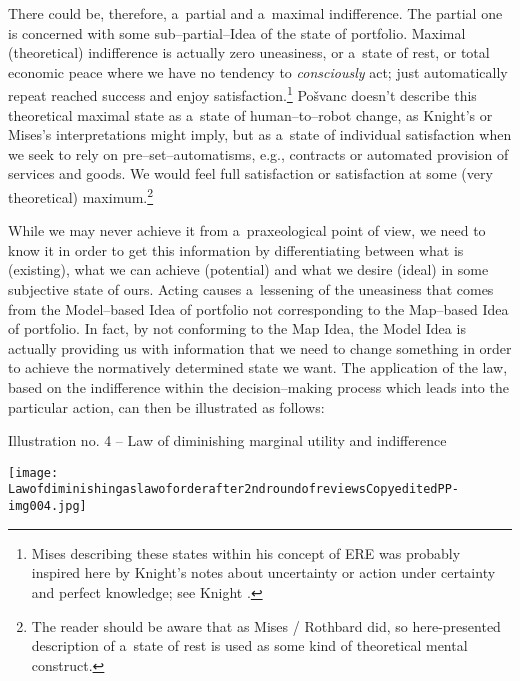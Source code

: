 There could be, therefore, a~partial and a~maximal indifference. The partial one is concerned with some sub–partial–Idea of the state of portfolio. Maximal (theoretical) indifference is actually zero uneasiness, or a~state of rest, or total economic peace 
\parencite[as described by][]{} %
 where we have no tendency to \textit{consciously} act; just automatically repeat reached success and enjoy satisfaction.\footnote{Mises describing these states within his concept of ERE was probably inspired here by Knight's notes about uncertainty or action under certainty and perfect knowledge; see Knight 
\parencites*[][]{}[][pp.201]{}.%
} Pošvanc 
\parencite[][pp.203–211]{} %
 doesn't describe this theoretical maximal state as a~state of human–to–robot change, as Knight's or Mises's interpretations might imply, but as a~state of individual satisfaction when we seek to rely on pre–set–automatisms, e.g., contracts or automated provision of services and goods. We would feel full satisfaction or satisfaction at some (very theoretical) maximum.\footnote{The reader should be aware that as Mises / Rothbard did, so here-presented description of a~state of rest is used as some kind of theoretical mental construct.}



While we may never achieve it from a~praxeological point of view, we need to know it in order to get this information by differentiating between what is (existing), what we can achieve (potential) and what we desire (ideal) in some subjective state of ours. Acting causes a~lessening of the uneasiness that comes from the Model–based Idea of portfolio not corresponding to the Map–based Idea of portfolio. In fact, by not conforming to the Map Idea, the Model Idea is actually providing us with information that we need to change something in order to achieve the normatively determined state we want. The application of the law, based on the indifference within the decision–making process which leads into the particular action, can then be illustrated as follows:



Illustration no. 4 -- Law of diminishing marginal utility and indifference



\texttt{[image: Lawofdiminishingaslawoforderafter2ndroundofreviewsCopyeditedPP-img004.jpg]}



